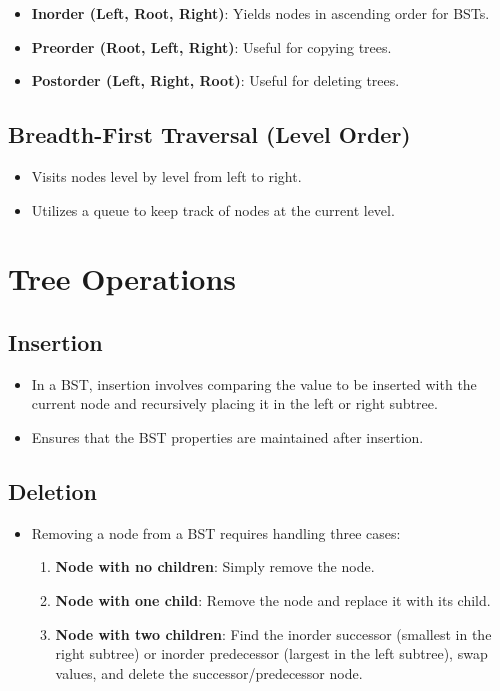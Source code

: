 \begin{itemize}
    \item \textbf{Inorder (Left, Root, Right)}: Yields nodes in ascending order for BSTs.
    \item \textbf{Preorder (Root, Left, Right)}: Useful for copying trees.
    \item \textbf{Postorder (Left, Right, Root)}: Useful for deleting trees.
\end{itemize}

\subsection{Breadth-First Traversal (Level Order)}

\begin{itemize}
    \item Visits nodes level by level from left to right.
    \item Utilizes a queue to keep track of nodes at the current level.
\end{itemize}

\section{Tree Operations}

\subsection{Insertion}

\begin{itemize}
    \item In a BST, insertion involves comparing the value to be inserted with the current node and recursively placing it in the left or right subtree.
    \item Ensures that the BST properties are maintained after insertion.
\end{itemize}

\subsection{Deletion}

\begin{itemize}
    \item Removing a node from a BST requires handling three cases:
        \begin{enumerate}
            \item \textbf{Node with no children}: Simply remove the node.
            \item \textbf{Node with one child}: Remove the node and replace it with its child.
            \item \textbf{Node with two children}: Find the inorder successor (smallest in the right subtree) or inorder predecessor (largest in the left subtree), swap values, and delete the successor/predecessor node.
        \end{enumerate}
\end{itemize}


